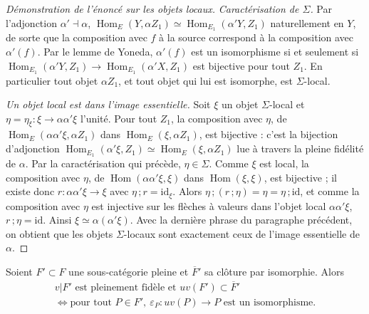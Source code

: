 \begin{proof}[Démonstration de l'énoncé sur les objets locaux]
\emph{Caractérisation de $\Sigma$.} Par l'adjonction $\alpha' \dashv \alpha$, $\operatorname{Hom}_E(Y, \alpha Z_1) \simeq \operatorname{Hom}_{E_1}(\alpha' Y, Z_1)$ naturellement en $Y$, de sorte que la composition avec $f$ à la source correspond à la composition avec $\alpha'(f)$. Par le lemme de Yoneda, $\alpha'(f)$ est un isomorphisme si et seulement si $\operatorname{Hom}_{E_1}(\alpha' Y, Z_1) \to \operatorname{Hom}_{E_1}(\alpha' X, Z_1)$ est bijective pour tout $Z_1$. En particulier tout objet $\alpha Z_1$, et tout objet qui lui est isomorphe, est $\Sigma$-local.

\emph{Un objet local est dans l'image essentielle.} Soit $\xi$ un objet $\Sigma$-local et $\eta = \eta_\xi : \xi \to \alpha\alpha'\xi$ l'unité. Pour tout $Z_1$, la composition avec $\eta$, de $\operatorname{Hom}_E(\alpha\alpha'\xi, \alpha Z_1)$ dans $\operatorname{Hom}_E(\xi, \alpha Z_1)$, est bijective : c'est la bijection d'adjonction $\operatorname{Hom}_{E_1}(\alpha'\xi, Z_1) \simeq \operatorname{Hom}_E(\xi, \alpha Z_1)$ lue à travers la pleine fidélité de $\alpha$. Par la caractérisation qui précède, $\eta \in \Sigma$. Comme $\xi$ est local, la composition avec $\eta$, de $\operatorname{Hom}(\alpha\alpha'\xi, \xi)$ dans $\operatorname{Hom}(\xi, \xi)$, est bijective ; il existe donc $r : \alpha\alpha'\xi \to \xi$ avec $\eta\,;r = \mathrm{id}_\xi$. Alors $\eta\,;(r\,;\eta) = \eta = \eta\,;\mathrm{id}$, et comme la composition avec $\eta$ est injective sur les flèches à valeurs dans l'objet local $\alpha\alpha'\xi$, $r\,;\eta = \mathrm{id}$. Ainsi $\xi \simeq \alpha(\alpha'\xi)$. Avec la dernière phrase du paragraphe précédent, on obtient que les objets $\Sigma$-locaux sont exactement ceux de l'image essentielle de $\alpha$.
\end{proof}

\begin{enonce}[(2), page 3]
Soient $F' \subset F$ une sous-catégorie pleine et $\overline{F}'$ sa clôture par isomorphie. Alors
\[
  \begin{gathered}
  v|F' \text{ est pleinement fidèle et } uv(F') \subset \overline{F}' \\
  \iff \text{pour tout } P \in F',\ \varepsilon_P : uv(P) \to P \text{ est un isomorphisme.}
  \end{gathered}
\]
\end{enonce}

